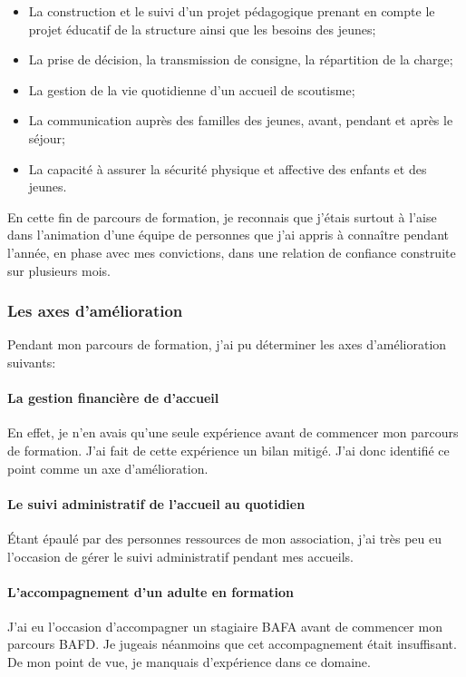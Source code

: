 \documentclass[titlepage,11pt,a4paper]{article}
\begin{document}
\begin{itemize}
   \item La construction et le suivi d'un projet pédagogique prenant en compte le
      projet éducatif de la structure ainsi que les besoins des jeunes;
   \item La prise de décision, la transmission de consigne, la répartition de la charge;
   \item La gestion de la vie quotidienne d'un accueil de scoutisme;
   \item La communication auprès des familles des jeunes, avant, pendant et après le
      séjour;
   \item La capacité à assurer la sécurité physique et affective des enfants et des
      jeunes.
\end{itemize}

En cette fin de parcours de formation, je reconnais que j'étais surtout à l'aise dans
l'animation d'une équipe de personnes que j'ai appris à connaître pendant l'année,
en phase avec mes convictions, dans une relation de confiance construite sur plusieurs mois.

\subsubsection{Les axes d'amélioration}

Pendant mon parcours de formation, j'ai pu déterminer les axes d'amélioration suivants:

\paragraph{La gestion financière de d'accueil} En effet, je n'en avais
qu'une seule expérience avant de commencer mon parcours de formation. J'ai fait de cette
expérience un bilan mitigé. J'ai donc identifié ce point comme un axe d'amélioration.

\paragraph{Le suivi administratif de l'accueil au quotidien} Étant épaulé par des
personnes ressources de mon association, j'ai très peu eu l'occasion de gérer le suivi
administratif pendant mes accueils.

\paragraph{L'accompagnement d'un adulte en formation} J'ai eu l'occasion d'accompagner un
stagiaire BAFA avant de commencer mon parcours BAFD\@. Je jugeais néanmoins que cet
accompagnement était insuffisant. De mon point de vue, je manquais d'expérience dans ce
domaine.
\end{document}
